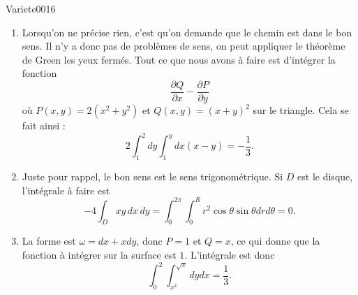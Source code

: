 
\begin{corrige}{Variete0016}

	\begin{enumerate}

		\item
			Lorsqu'on ne précise rien, c'est qu'on demande que le chemin est dans le \og bon\fg{} sens. Il n'y a donc pas de problèmes de sens, on peut appliquer le théorème de Green les yeux fermés. Tout ce que nous avons à faire est d'intégrer la fonction
			\begin{equation}
				\frac{ \partial Q }{ \partial x }-\frac{ \partial P }{ \partial y }
			\end{equation}
			où $P(x,y)=2(x^2+y^2)$ et $Q(x,y)=(x+y)^2$ sur le triangle. Cela se fait ainsi :
			\begin{equation}
				2\int_1^2dy\int_1^ydx(x-y)=-\frac{ 1 }{ 3 }.
			\end{equation}
			
		\item
			Juste pour rappel, le bon sens est le sens trigonométrique. Si $D$ est le disque, l'intégrale à faire est
			\begin{equation}
				-4\int_Dxy\,dx\,dy=\int_0^{2\pi}\int_0^R r^2\cos\theta\sin\theta drd\theta=0.
			\end{equation}
			
		\item
			La forme est $\omega=dx+xdy$, donc $P=1$ et $Q=x$, ce qui donne que la fonction à intégrer sur la surface est $1$. 
			L'intégrale est donc
			\begin{equation}
				\int_0^2\int_{x^2}^{\sqrt{x}}dydx=\frac{1}{ 3 }.
			\end{equation}


\end{enumerate}
\end{corrige}
